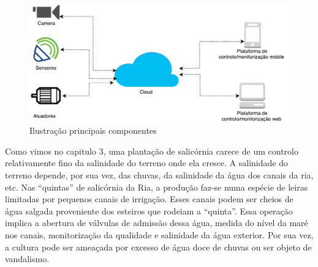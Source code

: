 \begin{figure}[!htb]
	\centering
	\includegraphics[scale=0.45]{esquemas/global_arquitetura.pdf}
	\caption{Ilustração principais componentes}
	\label{dikw}
\end{figure}







Como vimos no capitulo 3, uma plantação de  salicórnia carece de um controlo relativamente fino da salinidade do terreno onde ela cresce. A salinidade do terreno depende, por sua vez, das chuvas, da salinidade da água dos canais da ria, etc. Nas “quintas” de salicórnia da Ria, a produção faz-se numa espécie de leiras limitadas por pequenos canais de irrigação. Esses canais podem ser cheios de água salgada proveniente dos esteiros que rodeiam a “quinta”. Essa operação implica a abertura de válvulas de admissão dessa água, medida do nível da maré nos canais, monitorização da qualidade e salinidade da água exterior.
Por sua vez, a cultura pode ser ameaçada por excesso de água doce de chuvas ou ser objeto de vandalismo.


